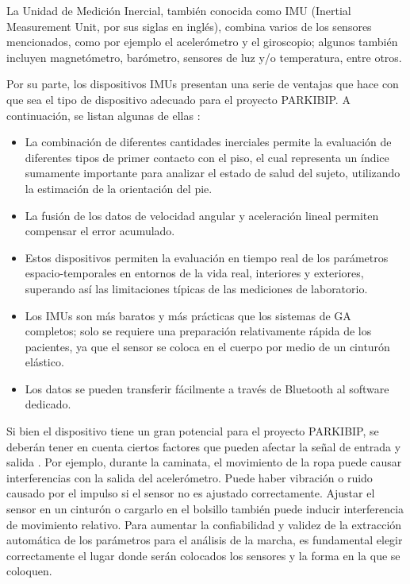 La Unidad de Medición Inercial, también conocida como IMU (Inertial Measurement Unit, por sus siglas en inglés), combina varios de los sensores mencionados, como por ejemplo el acelerómetro y el giroscopio; algunos también incluyen magnetómetro, barómetro, sensores de luz y/o temperatura, entre otros. 

Por su parte, los dispositivos IMUs presentan una serie de ventajas que hace con que sea el tipo de dispositivo adecuado para el proyecto PARKIBIP. A continuación, se listan algunas de ellas \cite{ZAGO201844}:

\begin{itemize}
    \item La combinación de diferentes cantidades inerciales permite la evaluación de diferentes tipos de primer contacto con el piso, el cual representa un índice sumamente importante para analizar el estado de salud del sujeto, utilizando la estimación de la orientación del pie. 
    \item La fusión de los datos de velocidad angular y aceleración lineal permiten compensar el error acumulado. 
    \item Estos dispositivos permiten la evaluación en tiempo real de los parámetros espacio-temporales en entornos de la vida real, interiores y exteriores, superando así las limitaciones típicas de las mediciones de laboratorio.
    \item Los IMUs son más baratos y más prácticas que los sistemas de GA completos; solo se requiere una preparación relativamente rápida de los pacientes, ya que el sensor se coloca en el cuerpo por medio de un cinturón elástico.
    \item Los datos se pueden transferir fácilmente a través de Bluetooth al software dedicado.
\end{itemize}

Si bien el dispositivo tiene un gran potencial para el proyecto PARKIBIP, se deberán tener en cuenta ciertos factores que pueden afectar la señal de entrada y salida \cite{Anwary8246577}. Por ejemplo, durante la caminata, el movimiento de la ropa puede causar interferencias con la salida del acelerómetro. Puede haber vibración o ruido causado por el impulso si el sensor no es ajustado correctamente. Ajustar el sensor en un cinturón o cargarlo en el bolsillo también puede inducir interferencia de movimiento relativo. Para aumentar la confiabilidad y validez de la extracción automática de los parámetros para el análisis de la marcha, es fundamental elegir correctamente el lugar donde serán colocados los sensores y la forma en la que se coloquen. 